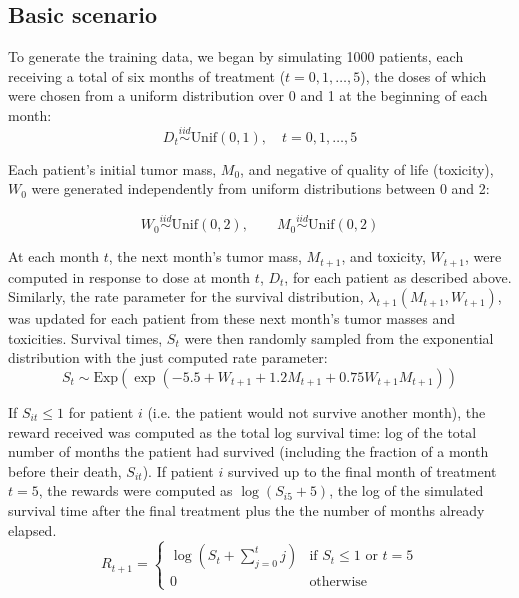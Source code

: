 \documentclass[12pt]{article}
\begin{document}


\subsection{Basic scenario} %
\label{sub:basic_setup}

To generate the training data, we began by simulating 1000 patients, each receiving a total of six months of treatment ($t = 0, 1, \ldots, 5$), the doses of which were chosen from a uniform distribution over 0 and 1 at the beginning of each month:
\begin{equation}
  D_{t} \overset{iid}{\sim} \text{Unif}(0, 1), \quad t = 0, 1, \ldots, 5
\end{equation}

Each patient's initial tumor mass, $M_{0}$, and negative of quality of life (toxicity), $W_{0}$ were generated independently from uniform distributions between 0 and 2:

\begin{equation}
  W_{0} \overset{iid}{\sim} \text{Unif}(0, 2), \qquad
  M_{0} \overset{iid}{\sim} \text{Unif}(0, 2)
\end{equation}

At each month $t$, the next month's tumor mass, $M_{t + 1}$, and toxicity, $W_{t + 1}$, were computed in response to dose at month $t$, $D_{t}$, for each patient as described above. Similarly, the rate parameter for the survival distribution, $\lambda_{t+1}(M_{t + 1}, W_{t + 1})$, was updated for each patient from these next month's tumor masses and toxicities. Survival times, $S_{t}$ were then randomly sampled from the exponential distribution with the just computed rate parameter:
\begin{equation}
  S_{t} \sim \text{Exp}(\exp(-5.5 + W_{t+1} + 1.2 M_{t+1} + 0.75 W_{t+1} M_{t+1}))
\end{equation}

If $S_{it} \leq 1$ for patient $i$ (i.e. the patient would not survive another month), the reward received was computed as the total log survival time: log of the total number of months the patient had survived (including the fraction of a month before their death, $S_{it}$). If patient $i$ survived up to the final month of treatment $t = 5$, the rewards were computed as $\log(S_{i5} + 5)$, the log of the simulated survival time after the final treatment plus the the number of months already elapsed.
\begin{equation}
  R_{t + 1} = \begin{cases}
    \log(S_{t} + \sum_{j = 0}^{t} j) & \text{if } S_{t} \leq 1 \text{ or } t = 5 \\
    0 & \text{otherwise}
  \end{cases}
\end{equation}
\end{document}
